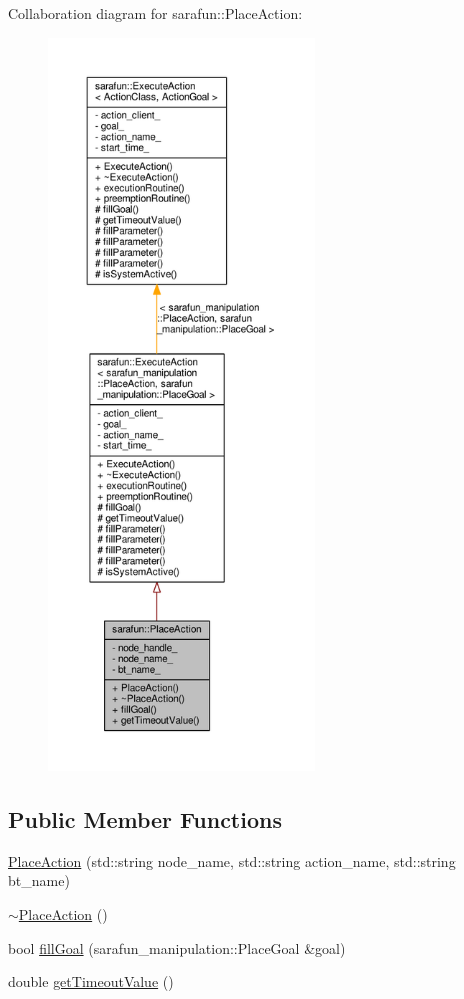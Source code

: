 Collaboration diagram for sarafun\-:\-:Place\-Action\-:
\nopagebreak
\begin{figure}[H]
\begin{center}
\leavevmode
\includegraphics[height=550pt]{d9/df5/classsarafun_1_1PlaceAction__coll__graph}
\end{center}
\end{figure}
\subsection*{Public Member Functions}
\begin{DoxyCompactItemize}
\item 
\hyperlink{classsarafun_1_1PlaceAction_ad55f21266cf4807d831e2834fb6e5259_ad55f21266cf4807d831e2834fb6e5259}{Place\-Action} (std\-::string node\-\_\-name, std\-::string action\-\_\-name, std\-::string bt\-\_\-name)
\item 
\hyperlink{classsarafun_1_1PlaceAction_ae98d86339fdd0d275acff03c968ff834_ae98d86339fdd0d275acff03c968ff834}{$\sim$\-Place\-Action} ()
\item 
bool \hyperlink{classsarafun_1_1PlaceAction_a7d48e758adf6cea93fa15409bafda8c8_a7d48e758adf6cea93fa15409bafda8c8}{fill\-Goal} (sarafun\-\_\-manipulation\-::\-Place\-Goal \&goal)
\item 
double \hyperlink{classsarafun_1_1PlaceAction_a0b53372fd2de920c3ebd94c8c7f80b6a_a0b53372fd2de920c3ebd94c8c7f80b6a}{get\-Timeout\-Value} ()
\end{DoxyCompactItemize}
